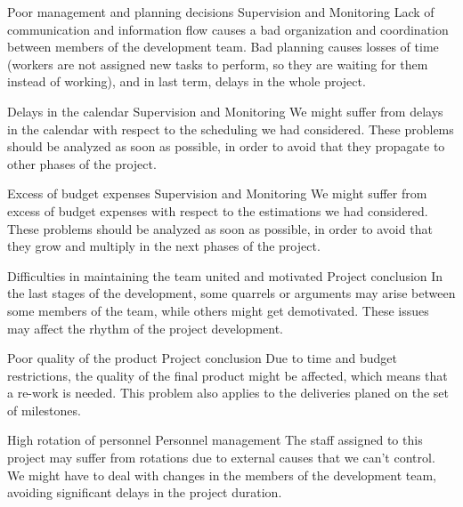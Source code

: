 \begin{risk}{Poor management and planning decisions}
\label{riskManagement}
\riskcat Supervision and Monitoring
\riskdesc Lack of communication and information flow causes a bad organization and coordination between members of the development team. Bad planning causes losses of time (workers are not assigned new tasks to perform, so they are waiting for them instead of working), and in last term, delays in the whole project.
\end{risk}

\begin{risk}{Delays in the calendar}
\label{riskDelays}
\riskcat Supervision and Monitoring
\riskdesc We might suffer from delays in the calendar with respect to the scheduling we had considered. These problems should be analyzed as soon as possible, in order to avoid that they propagate to other phases of the project.
\end{risk}

\begin{risk}{Excess of budget expenses}
\label{riskBudget}
\riskcat Supervision and Monitoring
\riskdesc We might suffer from excess of budget expenses with respect to the estimations we had considered. These problems should be analyzed as soon as possible, in order to avoid that they grow and multiply in the next phases of the project.
\end{risk}

\begin{risk}{Difficulties in maintaining the team united and motivated}
\label{riskMotivation}
\riskcat Project conclusion
\riskdesc In the last stages of the development, some quarrels or arguments may arise between some members of the team, while others might get demotivated. These issues may affect the rhythm of the project development.
\end{risk}

\begin{risk}{Poor quality of the product}
\label{riskQuality}
\riskcat Project conclusion
\riskdesc Due to time and budget restrictions, the quality of the final product might be affected, which means that a re-work is needed. This problem also applies to the deliveries planed on the set of milestones.
\end{risk}

\begin{risk}{High rotation of personnel}
\label{riskPersonnelRotation}
\riskcat Personnel management
\riskdesc The staff assigned to this project may suffer from rotations due to external causes that we can't control. We might have to deal with changes in the members of the development team, avoiding significant delays in the project duration.
\end{risk}

